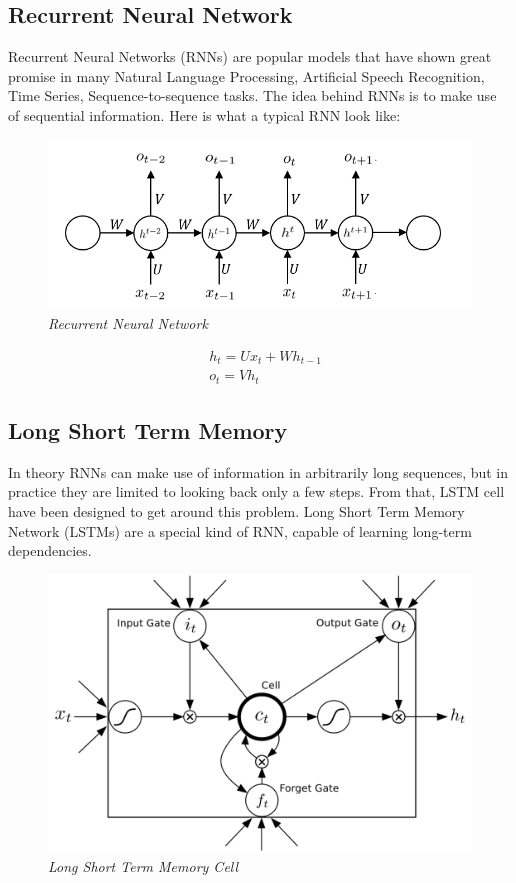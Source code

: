 \documentclass[conference]{IEEEtran}
\begin{document}
\subsection{Recurrent Neural Network}
Recurrent Neural Networks (RNNs) are popular models that have shown great promise in many Natural Language Processing, Artificial Speech Recognition, Time Series, Sequence-to-sequence tasks. The idea behind RNNs is to make use of sequential information. Here is what a typical RNN look like:
\begin{figure}[h]
\includegraphics[scale=0.5]{rnn.png}
\centering
\caption{\textit{Recurrent Neural Network}}
\end{figure}
\begin{align*}
	&h_t = Ux_t + Wh_{t-1}\\
	&o_t = Vh_t
\end{align*}


\subsection{Long Short Term Memory}
In theory RNNs can make use of information in arbitrarily long sequences, but in practice they are limited to looking back only a few steps. From that, LSTM cell have been designed to get around this problem. Long Short Term Memory Network (LSTMs) are a special kind of RNN, capable of learning long-term dependencies.

\begin{figure}[h]
\includegraphics[scale=0.5]{lstm.png}
\centering
\caption{\textit{Long Short Term Memory Cell}}
\end{figure}
\end{document}
